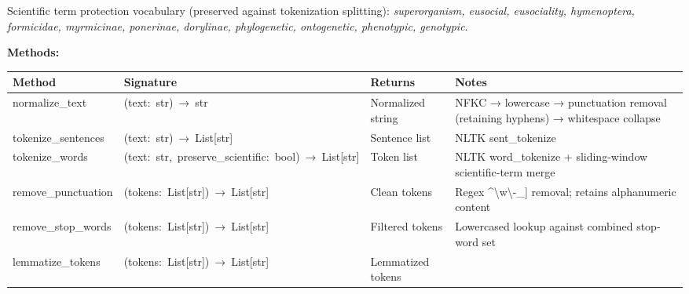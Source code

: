 \documentclass[
]{article}
\newcounter{none} %
\numberwithin{equation}{section}
\renewcommand{\texttt}[1]{%
    \colorbox{codebg}{\color{codefg}\ttfamily #1}%
}
\begin{document}
Scientific term protection vocabulary (preserved against tokenization
splitting): \emph{superorganism, eusocial, eusociality, hymenoptera,
formicidae, myrmicinae, ponerinae, dorylinae, phylogenetic, ontogenetic,
phenotypic, genotypic}.

\textbf{Methods:}

{\def\LTcaptype{none} %
\begin{longtable}[]{@{}
  >{\raggedright\arraybackslash}p{}
  >{\raggedright\arraybackslash}p{}
  >{\raggedright\arraybackslash}p{}
  >{\raggedright\arraybackslash}p{}@{}}
\toprule\noalign{}
\begin{minipage}[b]{\linewidth}\raggedright
Method
\end{minipage} & \begin{minipage}[b]{\linewidth}\raggedright
Signature
\end{minipage} & \begin{minipage}[b]{\linewidth}\raggedright
Returns
\end{minipage} & \begin{minipage}[b]{\linewidth}\raggedright
Notes
\end{minipage} \\
\midrule\noalign{}
\endhead
\bottomrule\noalign{}
\endlastfoot
\texttt{normalize\_text} & \texttt{(text:\ str)\ →\ str} & Normalized
string & NFKC → lowercase → punctuation removal (retaining hyphens) →
whitespace collapse \\
\texttt{tokenize\_sentences} & \texttt{(text:\ str)\ →\ List{[}str{]}} &
Sentence list & NLTK \texttt{sent\_tokenize} \\
\texttt{tokenize\_words} &
\texttt{(text:\ str,\ preserve\_scientific:\ bool)\ →\ List{[}str{]}} &
Token list & NLTK \texttt{word\_tokenize} + sliding-window
scientific-term merge \\
\texttt{remove\_punctuation} &
\texttt{(tokens:\ List{[}str{]})\ →\ List{[}str{]}} & Clean tokens &
Regex \texttt{{[}\^{}\textbackslash{}w\textbackslash{}-\_{]}} removal;
retains alphanumeric content \\
\texttt{remove\_stop\_words} &
\texttt{(tokens:\ List{[}str{]})\ →\ List{[}str{]}} & Filtered tokens &
Lowercased lookup against combined stop-word set \\
\texttt{lemmatize\_tokens} &
\texttt{(tokens:\ List{[}str{]})\ →\ List{[}str{]}} & Lemmatized tokens

\end{longtable}}
\end{document}
